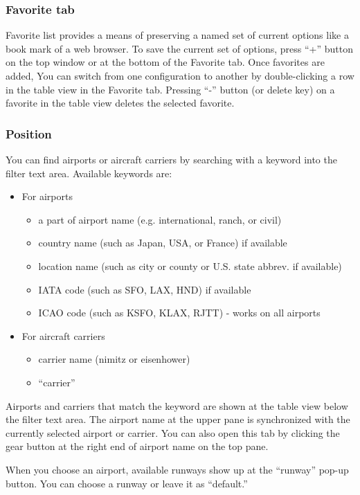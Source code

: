 \subsubsection{Favorite tab}
Favorite list provides a means of preserving a named set of current options like a book mark of a web browser. To save the current set of options, press ``+'' button on the top window or at the bottom of the Favorite tab. Once favorites are added, You can switch from one configuration to another by double-clicking a row in the table view in the Favorite tab. Pressing ``-'' button (or delete key) on a favorite in the table view deletes the selected favorite.

\subsubsection{Position}
You can find airports or aircraft carriers by searching with a keyword into the filter text area. Available keywords are:

\begin{itemize}
\item For airports
	\begin {itemize} 
	\item a part of airport name (e.g. international, ranch, or civil)
	\item country name (such as Japan, USA, or France) if available
	\item location name (such as city or county or U.S. state abbrev. if available)
	\item IATA code (such as SFO, LAX, HND) if available
	\item ICAO code (such as KSFO, KLAX, RJTT) - works on all airports
	\end{itemize}
\item For aircraft carriers
	\begin{itemize}
	\item carrier name (nimitz or eisenhower)
	\item ``carrier''
	\end{itemize}
\end{itemize}
Airports and carriers that match the keyword are shown at the table view below the filter text area. The airport name at the upper pane is synchronized with the currently selected airport or carrier. You can also open this tab by clicking the gear button at the right end of airport name on the top pane.

When you choose an airport, available runways show up at the ``runway'' pop-up button. You can choose a runway or leave it as ``default.''

